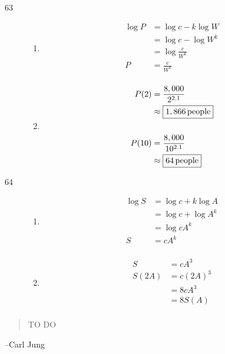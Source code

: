 \documentclass{exam}
\begin{document}
\begin{description}
      \item[63]
        \begin{enumerate}[a]
          \item 
            \begin{align*}
              \log P &= \log c - k \log W \\
                     &= \log c - \log W^k \\
                     &= \log \frac{c}{W^k} \\
                   P &= \boxed{\frac{c}{W^k}} \\
            \end{align*}

          \item
            \begin{align*}
              P(2)  & = \frac{8,000}{2^{2.1}} \\
                    & \approx \boxed{\unit[1,866]{people}} \\
              \\
              P(10) & = \frac{8,000}{10^{2.1}} \\
                    & \approx \boxed{\unit[64]{people}} \\
            \end{align*}

        \end{enumerate}

      \item[64]
        \begin{enumerate}[a]
          \item 
            \begin{align*}
              \log S &= \log c + k \log A \\
                     &= \log c + \log A^k \\
                     &= \log cA^k \\
                   S &= \boxed{cA^k} \\
            \end{align*}

          \item
            \begin{align*}
              S     &= cA^3 \\
              S(2A) &= c (2A)^3 \\
                    &= 8 cA^3 \\
                    &= \boxed{8 S(A)} \\
            \end{align*}

        \end{enumerate}


    \end{description}

  \else
    \vspace{2 cm}
    \begin{quote}
      \begin{em}
        TO DO
      \end{em}
    \end{quote}

    \hspace{1 cm} --Carl Jung
  \fi
\end{document}
